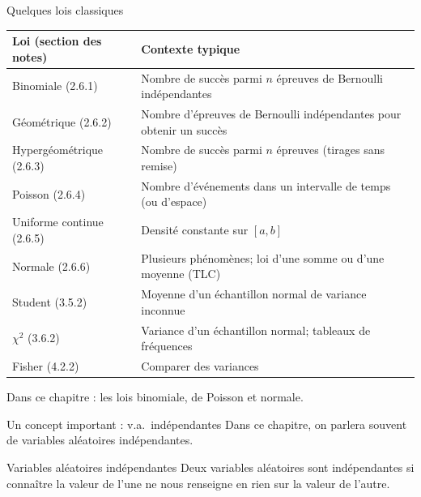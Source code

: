 \documentclass{BeamerTemplate}
\begin{document}
\begin{frame}[t]{Quelques lois classiques}
  \scriptsize
  \renewcommand{\arraystretch}{1.25}
  \begin{tabularx}{\textwidth}{@{}l X@{}}
    \toprule
    \textbf{Loi (section des notes)} & \textbf{Contexte typique} \\
    \midrule
    \alert{Binomiale} (2.6.1) & Nombre de succès parmi $n$ épreuves de Bernoulli indépendantes \\
    Géométrique (2.6.2) & Nombre d'épreuves de Bernoulli indépendantes pour obtenir un succès \\
    Hypergéométrique (2.6.3) & Nombre de succès parmi $n$ épreuves (tirages sans remise) \\
    \alert{Poisson} (2.6.4) & Nombre d'événements dans un intervalle de temps (ou d'espace) \\
    Uniforme continue (2.6.5) & Densité constante sur $[a, b]$ \\
    \alert{Normale} (2.6.6) & Plusieurs phénomènes; loi d'une somme ou d'une moyenne (TLC) \\
    Student (3.5.2) & Moyenne d'un échantillon normal de variance inconnue \\
    $\chi^2$ (3.6.2) & Variance d'un échantillon normal; tableaux de fréquences \\
    Fisher (4.2.2) & Comparer des variances \\
    \bottomrule
  \end{tabularx}

  \medskip
  Dans ce chapitre : les lois \alert{binomiale}, de \alert{Poisson} et \alert{normale}.
\end{frame}

\begin{frame}[t]{Un concept important : v.a.\ indépendantes}
  Dans ce chapitre, on parlera souvent de variables aléatoires indépendantes.

  \begin{Boite}{Variables aléatoires indépendantes}
    Deux variables aléatoires sont \alert{indépendantes} si connaître la valeur
    de l'une ne nous renseigne en rien sur la valeur de l'autre.
  \end{Boite}

\end{frame}
\end{document}
